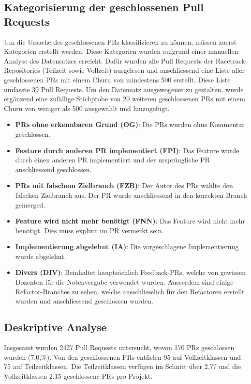 \subsection{Kategorisierung der geschlossenen Pull Requests}
\label{sec:KategorienGeschlossenePRs} 
Um die Ursache des geschlossenen PRs klassifizieren zu können, müssen zuerst Kategorien erstellt werden. Diese Kategorien wurden aufgrund einer manuellen Analyse des Datensatzes erreicht. 
Dafür wurden alle Pull Requests der Racetrack-Repositories (Teilzeit sowie Vollzeit) ausgelesen und anschliessend eine Liste aller geschlossenen PRs mit einem Churn von mindestens 500 erstellt. Diese Liste umfasste 39 Pull Requests. Um den Datensatz ausgewogener zu gestalten, wurde ergänzend eine zufällige Stichprobe von 20 weiteren geschlossenen PRs mit einem Churn von weniger als 500 ausgewählt und hinzugefügt.

\begin{itemize}
    \item \textbf{PRs ohne erkennbaren Grund (OG)}: Die PRs wurden ohne Kommentar geschlossen.
    \item \textbf{Feature durch anderen PR implementiert (FPI)}: Das Feature wurde durch einen anderen PR implementiert und der ursprüngliche PR anschliessend geschlossen.
    \item \textbf{PRs mit falschem Zielbranch (FZB)}: Der Autor des PRs wählte den falschen Zielbranch aus. Der PR wurde anschliessend in den korrekten Branch gemerged.
    \item \textbf{Feature wird nicht mehr benötigt (FNN)}: Das Feature wird nicht mehr benötigt. Dies muss explizit im PR vermerkt sein.
    \item \textbf{Implementierung abgelehnt (IA)}: Die vorgeschlagene Implementierung wurde abgelehnt.
    \item \textbf{Divers (DIV)}: Beinhaltet hauptsächlich Feedback-PRs, welche von gewissen Dozenten für die Notenvergabe verwendet wurden. Ausserdem sind einige Refactor-Branches zu sehen, welche ausschliesslich für den Refactoren erstellt wurden und anschliessend geschlossen wurden. 
\end{itemize}

\subsection{Deskriptive Analyse}
Insgesamt wurden 2427 Pull Requests untersucht, wovon 170 PRs geschlossen wurden (7,0,\%). Von den geschlossenen PRs entfielen 95 auf Vollzeitklassen und 75 auf Teilzeitklassen. Die Teilzeitklassen verfügen im Schnitt über 2.77 und die Vollzeitklassen 2.15 geschlossene PRs pro Projekt. 


